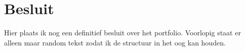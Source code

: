 \chapter{Besluit}
\label{besluit}
\thispagestyle{chapternohead}


Hier plaats ik nog een definitief besluit over het portfolio. Voorlopig staat er alleen maar random tekst zodat ik de structuur in het oog kan houden.\newline\newline

\lipsum[1-5]

\pagestyle{ruledfilip}

